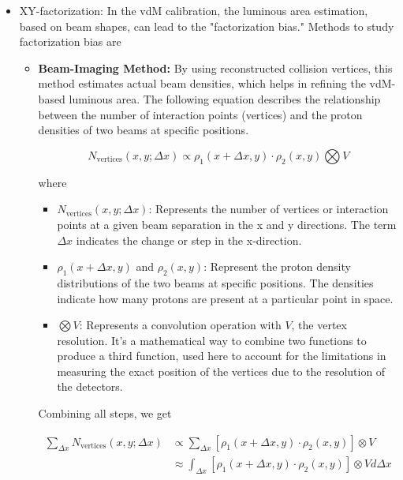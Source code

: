 \begin{itemize}

\item XY-factorization: In the vdM calibration, the luminous area estimation, based on beam shapes, can lead to the "factorization bias." Methods to study factorization bias are 

\begin{itemize}

\item \textbf{Beam-Imaging Method:} By using reconstructed collision vertices, this method estimates actual beam densities, which helps in refining the vdM-based luminous area. The following equation describes the relationship between the number of interaction points (vertices) and the proton densities of two beams at specific positions.

\begin{equation}
N_{\text{vertices}}(x, y; \Delta x) \propto \rho_1(x + \Delta x, y) \cdot \rho_2(x, y) \bigotimes V
\end{equation}

where
\begin{itemize}
  \item \(N_{\text{vertices}}(x, y; \Delta x)\): Represents the number of vertices or interaction points at a given beam separation in the x and y directions. The term \(\Delta x\) indicates the change or step in the x-direction.
  
  \item \(\rho_1(x + \Delta x, y)\) and \(\rho_2(x, y)\): Represent the proton density distributions of the two beams at specific positions. The densities indicate how many protons are present at a particular point in space.
  
  \item \(\bigotimes V\): Represents a convolution operation with \(V\), the vertex resolution. It's a mathematical way to combine two functions to produce a third function, used here to account for the limitations in measuring the exact position of the vertices due to the resolution of the detectors.
\end{itemize}

Combining all steps, we get


\begin{align}
\sum_{\Delta x} N_{\text{vertices}}(x, y; \Delta x) &\propto \sum_{\Delta x} \left[ \rho_1(x + \Delta x, y) \cdot \rho_2(x, y) \right] \otimes V \nonumber \\
&\approx \int_{\Delta x} \left[ \rho_1(x + \Delta x, y) \cdot \rho_2(x, y) \right] \otimes V d\Delta x
\end{align}


\end{itemize}
\end{itemize}
